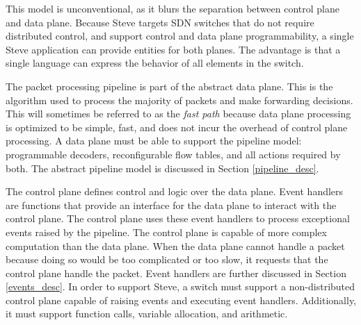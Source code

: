 This model is unconventional, as it blurs the separation between control plane and data plane. Because Steve targets SDN switches that do not require distributed control, and support control and data plane programmability, a single Steve application can provide entities for both planes. The advantage is that a single language can express the behavior of all elements in the switch.

The packet processing pipeline is part of the abstract data plane.
This is the algorithm used to process the majority of packets and
make forwarding decisions.
This will sometimes be referred to as the \emph{fast path} because
data plane processing is optimized to be simple, fast, and does not incur the overhead of control plane processing. 
A data plane must be able to support the pipeline model: programmable decoders, reconfigurable flow tables, and all actions required by both.
The abstract pipeline model is discussed in Section \ref{pipeline_desc}.

The control plane defines control
and logic over the data plane.
Event handlers are functions that provide an interface for the data plane to interact with
the control plane.
The control plane uses these event handlers
to process exceptional events raised by the pipeline.
The control plane is capable of more complex computation than the data plane.
When the data plane cannot handle a packet because doing so would be too complicated or too slow, it requests that the control plane handle the packet.
Event handlers are further discussed in Section \ref{events_desc}.
In order to support Steve, a switch must support a non-distributed control
plane capable of raising events and executing event handlers. Additionally, it must support function calls, variable allocation, and arithmetic.

